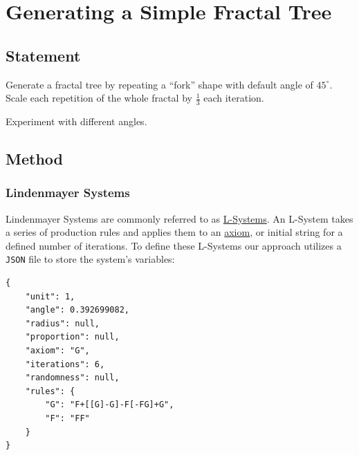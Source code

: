 \section{Generating a Simple Fractal Tree}

\subsection{Statement}

Generate a fractal tree by repeating a ``fork'' shape with default angle of $45^\circ$.
Scale each repetition of the whole fractal by $\frac{1}{3}$ each iteration.

Experiment with different angles.

\subsection{Method}\label{sec:l-system-method}

\subsubsection{Lindenmayer Systems}
Lindenmayer Systems are commonly referred to as
\href{https://en.wikipedia.org/wiki/L-system}{L-Systems}. An L-System takes a
series of production rules and applies them to an
\href{https://en.wikipedia.org/wiki/Axiom}{axiom}, or initial string for a
defined number of iterations. To define these L-Systems our approach utilizes a
\texttt{JSON} file to store the system's variables:

\begin{verbatim}
{
    "unit": 1,
    "angle": 0.392699082,
    "radius": null,
    "proportion": null,
    "axiom": "G",
    "iterations": 6,
    "randomness": null,
    "rules": {
        "G": "F+[[G]-G]-F[-FG]+G",
        "F": "FF"
    }
}
\end{verbatim}

